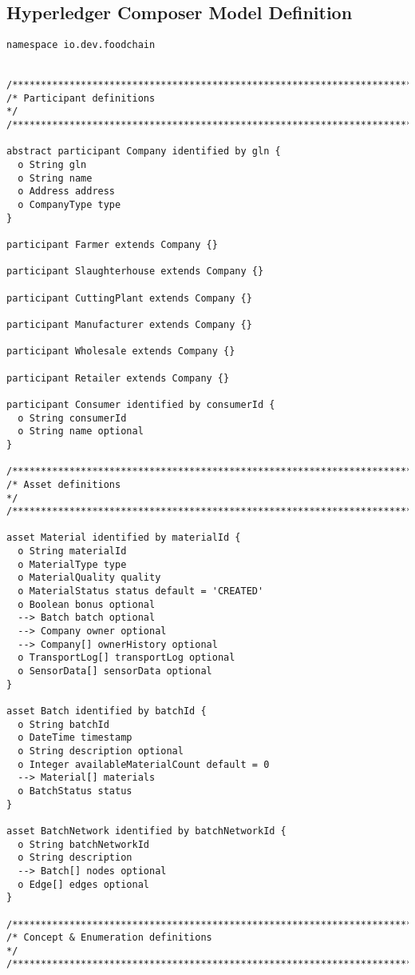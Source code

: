 \subsection{Hyperledger Composer Model Definition} \label{lst:hlc-model-definition}
\begin{lstlisting}[]
namespace io.dev.foodchain


/*****************************************************************************/
/* Participant definitions                                                   */
/*****************************************************************************/

abstract participant Company identified by gln {
  o String gln
  o String name
  o Address address
  o CompanyType type
}

participant Farmer extends Company {}

participant Slaughterhouse extends Company {}

participant CuttingPlant extends Company {}

participant Manufacturer extends Company {}

participant Wholesale extends Company {}

participant Retailer extends Company {}

participant Consumer identified by consumerId {
  o String consumerId
  o String name optional
}

/*****************************************************************************/
/* Asset definitions                                                         */
/*****************************************************************************/

asset Material identified by materialId {
  o String materialId
  o MaterialType type
  o MaterialQuality quality
  o MaterialStatus status default = 'CREATED'
  o Boolean bonus optional
  --> Batch batch optional
  --> Company owner optional
  --> Company[] ownerHistory optional
  o TransportLog[] transportLog optional
  o SensorData[] sensorData optional
}

asset Batch identified by batchId {
  o String batchId
  o DateTime timestamp
  o String description optional
  o Integer availableMaterialCount default = 0
  --> Material[] materials
  o BatchStatus status
}

asset BatchNetwork identified by batchNetworkId {
  o String batchNetworkId
  o String description
  --> Batch[] nodes optional
  o Edge[] edges optional
}

/*****************************************************************************/
/* Concept & Enumeration definitions                                         */
/*****************************************************************************/


\end{lstlisting}
